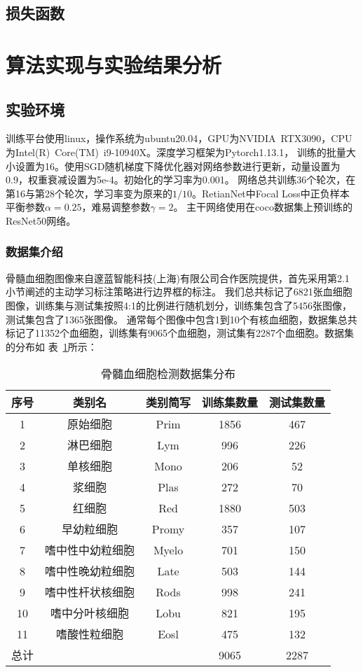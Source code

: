 \subsection{损失函数}

\section{算法实现与实验结果分析}
\subsection{实验环境}
训练平台使用linux，操作系统为ubuntu20.04，GPU为NVIDIA$\enspace$RTX3090，CPU为Intel(R)$\enspace$Core(TM)$\enspace$i9-10940X。深度学习框架为Pytorch1.13.1，
训练的批量大小设置为16。使用SGD随机梯度下降优化器对网络参数进行更新，动量设置为0.9，权重衰减设置为5e-4。初始化的学习率为0.001。
网络总共训练36个轮次，在第16与第28个轮次，学习率变为原来的$1/10$。RetianNet中Focal Loss中正负样本平衡参数$\alpha=0.25$，难易调整参数$\gamma=2$。
主干网络使用在coco数据集上预训练的ResNet50网络。
\subsubsection{数据集介绍}

骨髓血细胞图像来自邃蓝智能科技(上海)有限公司合作医院提供，首先采用第2.1小节阐述的主动学习标注策略进行边界框的标注。
我们总共标记了6821张血细胞图像，训练集与测试集按照4:1的比例进行随机划分，训练集包含了5456张图像，测试集包含了1365张图像。
通常每个图像中包含1到10个有核血细胞，数据集总共标记了11352个血细胞，训练集有9065个血细胞，测试集有2287个血细胞。数据集的分布如
表~\ref{table:cell_detect1}所示：

\begin{table}
  \caption{骨髓血细胞检测数据集分布}   
  \centering 
  \label{table:cell_detect1}
  \begin{tabular}{ccccc}
    \toprule[2pt]
    序号 & 类别名  &  类别简写 & 训练集数量 & 测试集数量 \\
    \midrule[1.5pt] 
    1 & 原始细胞 & Prim & 1856 & 467 \\ 
    2 & 淋巴细胞 & Lym & 996 & 226   \\ 
    3 & 单核细胞 & Mono & 206 & 52   \\ 
    4 & 浆细胞 & Plas & 272 & 70   \\ 
    5 & 红细胞 & Red & 1880 & 503   \\ 
    6 & 早幼粒细胞 & Promy & 357 & 107   \\ 
    7 & 嗜中性中幼粒细胞 & Myelo & 701 & 150   \\ 
    8 & 嗜中性晚幼粒细胞 & Late & 503 & 144   \\ 
    9 & 嗜中性杆状核细胞 & Rods & 998 & 241   \\  
    10 & 嗜中分叶核细胞 & Lobu & 821 & 195   \\  
    11 & 嗜酸性粒细胞 & Eosl & 475 & 132   \\  
    \hline
    总计 &   &   & 9065 & 2287 \\
    \bottomrule[2pt]      
  \end{tabular} 
\end{table}

